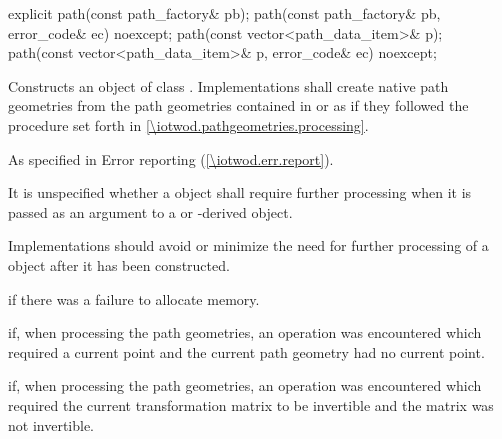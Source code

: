 \begin{itemdecl}
    explicit path(const path_factory& pb);
    path(const path_factory& pb, error_code& ec) noexcept;
    path(const vector<path_data_item>& p);
    path(const vector<path_data_item>& p, error_code& ec) noexcept;
\end{itemdecl}
\begin{itemdescr}
	\pnum
	\effects
	Constructs an object of class . Implementations shall create native path geometries from the path geometries contained in  or  as if they followed the procedure set forth in \ref{\iotwod.pathgeometries.processing}.

	\pnum
	\throws
	As specified in Error reporting (\ref{\iotwod.err.report}).

	\pnum
	\remarks
	It is unspecified whether a  object shall require further processing when it is passed as an argument to a  or -derived object.
	
	\pnum
	Implementations should avoid or minimize the need for further processing of a  object after it has been constructed.

	\pnum
	\errors
	 if there was a failure to allocate memory.
	
	\pnum
	 if, when processing the path geometries, an operation was encountered which required a current point and the current path geometry had no current point.
	
	\pnum
	 if, when processing the path geometries, an operation was encountered which required the current transformation matrix to be invertible and the matrix was not invertible.
	
\end{itemdescr}
